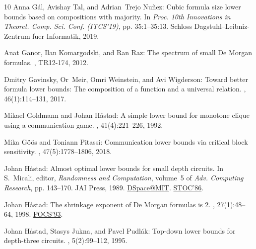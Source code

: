 \begin{thebibliography}{10}
{\sc Anna G{\'{a}}l, Avishay Tal, and Adrian~Trejo Nu{\~{n}}ez}: Cubic formula
  size lower bounds based on compositions with majority.
\newblock In {\em Proc. 10th Innovations in Theoret. Comp. Sci. Conf.
  (ITCS'19)}, pp. 35:1--35:13. Schloss Dagstuhl--Leibniz-Zentrum fuer
  Informatik, 2019.

{\sc Anat Ganor, Ilan Komargodski, and Ran Raz}: The spectrum of small {D}e
  {M}organ formulas.
, TR12-174, 2012.

{\sc Dmitry Gavinsky, Or~Meir, Omri Weinstein, and Avi Wigderson}: Toward
  better formula lower bounds: The composition of a function and a universal
  relation.
, 46(1):114--131, 2017.
\newblock [\epfmtdoi{10.1137/15M1018319}]

{\sc Mikael Goldmann and Johan H{\aa}stad}: A simple lower bound for monotone
  clique using a communication game.
, 41(4):221--226, 1992.
\newblock [\epfmtdoi{10.1016/0020-0190(92)90184-W}]

{\sc Mika G{\"{o}}{\"{o}}s and Toniann Pitassi}: Communication lower bounds via
  critical block sensitivity.
, 47(5):1778--1806, 2018.
\newblock [\epfmtdoi{10.1137/16M1082007}]

{\sc Johan H{\aa}stad}: Almost optimal lower bounds for small depth circuits.
\newblock In {\sc S.~Micali}, editor, {\em Randomness and Computation},
  volume~5 of {\em Adv. Computing Research}, pp. 143--170. JAI Press, 1989.
\newblock \href{https://hdl.handle.net/1721.1/151177}{DSpace@MIT}. \prelim
  \href{https://doi.org/10.1145/12130.12132}{STOC'86}.

{\sc Johan H{\aa}stad}: The shrinkage exponent of {D}e {M}organ formulas is 2.
, 27(1):48--64, 1998.
\newblock \prelim \href{https://doi.org/10.1109/SFCS.1993.366876}{FOCS'93}.
\newblock [\epfmtdoi{10.1137/S0097539794261556}]

{\sc Johan H{\aa}stad, Stasys Jukna, and Pavel Pudl{\'a}k}: Top-down lower
  bounds for depth-three circuits.
, 5(2):99--112, 1995.
\newblock [\epfmtdoi{10.1007/BF01268140}]


\end{thebibliography}
